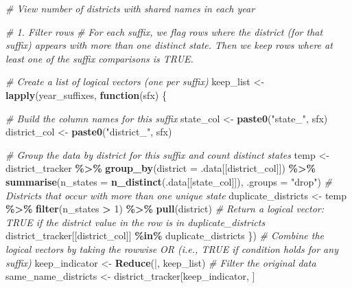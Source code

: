 \documentclass[
]{article}
\newenvironment{Shaded}{\begin{snugshade}}{\end{snugshade}}
\newcommand{\AttributeTok}[1]{\textcolor[rgb]{0.13,0.29,0.53}{#1}}
\newcommand{\CommentTok}[1]{\textcolor[rgb]{0.56,0.35,0.01}{\textit{#1}}}
\newcommand{\ControlFlowTok}[1]{\textcolor[rgb]{0.13,0.29,0.53}{\textbf{#1}}}
\newcommand{\DecValTok}[1]{\textcolor[rgb]{0.00,0.00,0.81}{#1}}
\newcommand{\FunctionTok}[1]{\textcolor[rgb]{0.13,0.29,0.53}{\textbf{#1}}}
\newcommand{\NormalTok}[1]{#1}
\newcommand{\OtherTok}[1]{\textcolor[rgb]{0.56,0.35,0.01}{#1}}
\newcommand{\SpecialCharTok}[1]{\textcolor[rgb]{0.81,0.36,0.00}{\textbf{#1}}}
\newcommand{\StringTok}[1]{\textcolor[rgb]{0.31,0.60,0.02}{#1}}
\begin{document}
\begin{Shaded}
\begin{Highlighting}[]
\CommentTok{\# View number of districts with shared names in each year}

\CommentTok{\# 1. Filter rows}
\CommentTok{\# For each suffix, we flag rows where the district (for that suffix) appears with more than one distinct state. Then we keep rows where at least one of the suffix comparisons is TRUE.}

\CommentTok{\# Create a list of logical vectors (one per suffix)}
\NormalTok{keep\_list }\OtherTok{\textless{}{-}} \FunctionTok{lapply}\NormalTok{(year\_suffixes, }\ControlFlowTok{function}\NormalTok{(sfx) \{}
  
  \CommentTok{\# Build the column names for this suffix}
\NormalTok{  state\_col }\OtherTok{\textless{}{-}} \FunctionTok{paste0}\NormalTok{(}\StringTok{"state\_"}\NormalTok{, sfx)}
\NormalTok{  district\_col }\OtherTok{\textless{}{-}} \FunctionTok{paste0}\NormalTok{(}\StringTok{"district\_"}\NormalTok{, sfx)}
  
  \CommentTok{\# Group the data by district for this suffix and count distinct states}
\NormalTok{  temp }\OtherTok{\textless{}{-}}\NormalTok{ district\_tracker }\SpecialCharTok{\%\textgreater{}\%}
    \FunctionTok{group\_by}\NormalTok{(}\AttributeTok{district =}\NormalTok{ .data[[district\_col]]) }\SpecialCharTok{\%\textgreater{}\%}
    \FunctionTok{summarise}\NormalTok{(}\AttributeTok{n\_states =} \FunctionTok{n\_distinct}\NormalTok{(.data[[state\_col]]),}
              \AttributeTok{.groups =} \StringTok{"drop"}\NormalTok{)}
  \CommentTok{\# Districts that occur with more than one unique state}
\NormalTok{  duplicate\_districts }\OtherTok{\textless{}{-}}\NormalTok{ temp }\SpecialCharTok{\%\textgreater{}\%}
    \FunctionTok{filter}\NormalTok{(n\_states }\SpecialCharTok{\textgreater{}} \DecValTok{1}\NormalTok{) }\SpecialCharTok{\%\textgreater{}\%}
    \FunctionTok{pull}\NormalTok{(district)}
  \CommentTok{\# Return a logical vector: TRUE if the district value in the row is in duplicate\_districts}
\NormalTok{  district\_tracker[[district\_col]] }\SpecialCharTok{\%in\%}\NormalTok{ duplicate\_districts}
\NormalTok{\})}
\CommentTok{\# Combine the logical vectors by taking the rowwise OR (i.e., TRUE if condition holds for any suffix)}
\NormalTok{keep\_indicator }\OtherTok{\textless{}{-}} \FunctionTok{Reduce}\NormalTok{(}\StringTok{\textasciigrave{}}\AttributeTok{|}\StringTok{\textasciigrave{}}\NormalTok{, keep\_list)}
\CommentTok{\# Filter the original data}
\NormalTok{same\_name\_districts }\OtherTok{\textless{}{-}}\NormalTok{ district\_tracker[keep\_indicator, ]}


\end{Highlighting}
\end{Shaded}
\end{document}
